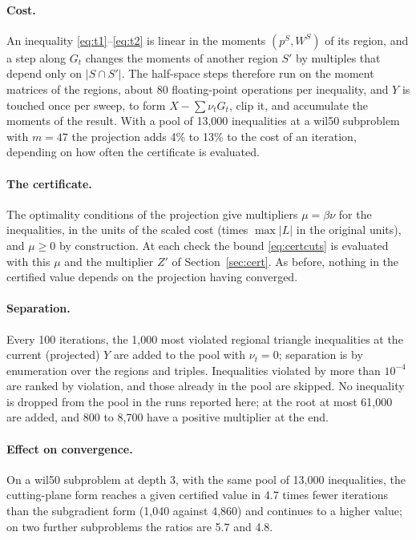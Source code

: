 \documentclass[11pt]{article}
\theoremstyle{remark}
\begin{document}
\paragraph{Cost.} An inequality \eqref{eq:t1}--\eqref{eq:t2} is linear in the
moments $(p^S, W^S)$ of its region, and a step along $G_t$ changes the moments of
another region $S'$ by multiples that depend only on $|S\cap S'|$. The half-space
steps therefore run on the moment matrices of the regions, about 80 floating-point
operations per inequality, and $Y$ is touched once per sweep, to form
$X - \sum\nu_tG_t$, clip it, and accumulate the moments of the result. With a
pool of 13,000 inequalities at a wil50 subproblem with $m = 47$ the projection
adds 4\% to 13\% to the cost of an iteration, depending on how often the
certificate is evaluated. %

\paragraph{The certificate.} The optimality conditions of the projection give
multipliers $\mu = \beta\nu$ for the inequalities, in the units of the scaled
cost (times $\max|L|$ in the original units), and $\mu\ge0$ by construction. At
each check the bound \eqref{eq:certcuts} is evaluated with this $\mu$ and the
multiplier $Z'$ of Section~\ref{sec:cert}. As before, nothing in the certified
value depends on the projection having converged.

\paragraph{Separation.} Every 100 iterations, the 1,000 most violated regional
triangle inequalities at the current (projected) $Y$ are added to the pool with
$\nu_t = 0$; separation is by enumeration over the regions and triples.
Inequalities violated by more than $10^{-4}$ are ranked by violation, and those
already in the pool are skipped. No inequality is dropped from the pool in the
runs reported here; at the root at most 61,000 are added, and 800 to 8,700 have a positive
multiplier at the end.

\paragraph{Effect on convergence.} On a wil50 subproblem at depth 3, with the
same pool of 13,000 inequalities, the cutting-plane form reaches a given
certified value in 4.7 times fewer iterations than the subgradient form (1,040
against 4,860) and continues to a higher value; on two further subproblems the
ratios are 5.7 and 4.8. %
\end{document}
